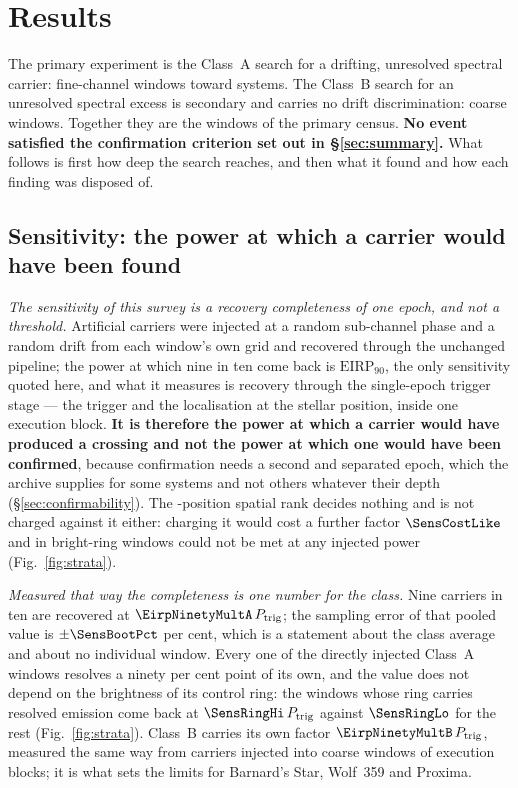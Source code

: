 \section{Results}
\label{sec:results}

The primary experiment is the Class~A search for a drifting, unresolved
spectral carrier: \NWinA{} fine-channel windows toward \NSysClassA{}
systems. The Class~B search for an unresolved spectral excess is secondary
and carries no drift discrimination: \NWinB{} coarse windows. Together they
are the \NWindows{} windows of the primary census. \textbf{No event
satisfied the confirmation criterion set out in \S\ref{sec:summary}.} What
follows is first how deep the search reaches, and then what it found and how
each finding was disposed of.

\subsection{Sensitivity: the power at which a carrier would have been
found} \label{sec:pninetysel}

\emph{The sensitivity of this survey is a recovery completeness of one epoch,
and not a threshold.} Artificial carriers were injected at a random
sub-channel phase and a random drift from each window's own grid and recovered
through the unchanged pipeline; the power at which nine in ten come back is
$\mathrm{EIRP}_{90}$, the only sensitivity quoted here, and what it measures
is recovery through the single-epoch trigger stage --- the trigger and the
localisation at the stellar position, inside one execution block.
\textbf{It is therefore the power at which a
carrier would have produced a crossing and not the power at which one would
have been confirmed}, because confirmation needs a second and separated epoch,
which the archive supplies for some systems and not others whatever their
depth (\S\ref{sec:confirmability}). The \NCtrl-position spatial rank decides
nothing and is not charged against it either: charging it would cost a further
factor $\SensCostLike$ and in \SensNRingHiUnres{} bright-ring windows could not
be met at any injected power (Fig.~\ref{fig:strata}).

\emph{Measured that way the completeness is one number for the class.} Nine
carriers in ten are recovered at $\EirpNinetyMultA\,P_{\rm trig}$; the sampling
error of that pooled value is $\pm\SensBootPct$ per cent, which is a statement
about the class average and about no individual window. Every one of the
\SensNInj{} directly injected Class~A windows resolves a ninety per cent point
of its own, and the value does not depend on the brightness of its control
ring: the \SensNRingHi{} windows whose ring carries resolved emission come
back at $\SensRingHi\,P_{\rm trig}$ against $\SensRingLo$ for the rest
(Fig.~\ref{fig:strata}). Class~B carries
its own factor $\EirpNinetyMultB\,P_{\rm trig}$, measured the same way from
\SensNToneCoarse{} carriers injected into \SensNInjCoarse{} coarse windows of
\SensNInjCoarseBlock{} execution blocks; it is what sets the limits for
Barnard's Star, Wolf~359 and Proxima.

